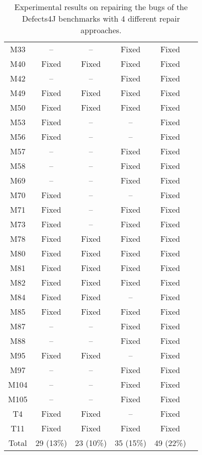 \begin{table}[!t]
{\begin{tabular}{|c|c|c|c|c|c|}
M33               & --        & --        & Fixed     &Fixed   \\
M40               & Fixed     & Fixed     & Fixed     &Fixed   \\
M42               & --        & --        & Fixed     &Fixed   \\
M49               & Fixed     & Fixed     & Fixed     &Fixed   \\
M50               & Fixed     & Fixed     & Fixed     &Fixed   \\
M53               & Fixed     & --        & --        &Fixed   \\
M56               & Fixed     & --        & --        &Fixed   \\
M57               & --        & --        & Fixed     &Fixed   \\
M58               & --        & --        & Fixed     &Fixed   \\
M69               & --        & --        & Fixed     &Fixed   \\
M70               & Fixed     & --        & --        &Fixed   \\
M71               & Fixed     & --        & Fixed     &Fixed   \\
M73               & Fixed     & --        & Fixed     &Fixed   \\
M78               & Fixed     & Fixed     & Fixed     &Fixed   \\
M80               & Fixed     & Fixed     & Fixed     &Fixed   \\
M81               & Fixed     & Fixed     & Fixed     &Fixed   \\
M82               & Fixed     & Fixed     & Fixed     &Fixed   \\
M84               & Fixed     & Fixed     & --        &Fixed   \\
M85               & Fixed     & Fixed     & Fixed     &Fixed   \\
M87               & --        & --        & Fixed     &Fixed   \\
M88               & --        & --        & Fixed     &Fixed   \\
M95               & Fixed     & Fixed     & --        &Fixed   \\
M97               & --        & --        & Fixed     &Fixed   \\
M104              & --        & --        & Fixed     &Fixed   \\
M105              & --        & --        & Fixed     &Fixed   \\
\hline
T4                & Fixed     & Fixed     & --        &Fixed   \\
T11               & Fixed     & Fixed     & Fixed     &Fixed   \\
\hline
Total             & 29 (13\%) & 23 (10\%) & 35 (15\%) & 49 (22\%)\\
\hline 
\end{tabular}%
}
\caption{Experimental results on repairing the bugs of the Defects4J benchmarks with 4 different repair approaches.}
\end{table}
